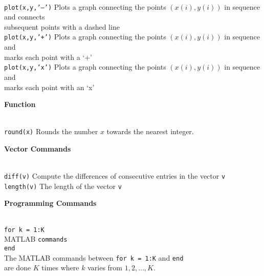 \documentclass{ximera}
\begin{document}
\begin{tabbing}
 \hspace{1.2in} \= \\
 
     {\tt plot(x,y,'--')}   \>
 Plots a graph connecting the points $(x(i),y(i))$
        in sequence and connects \\ \> subsequent points with a dashed line\\

     {\tt plot(x,y,'+')}   \>
 Plots a graph connecting the points $(x(i),y(i))$
        in sequence and \\ \>  marks each point with a `+'\\

     {\tt plot(x,y,'x')}   \>
 Plots a graph connecting the points $(x(i),y(i))$
        in sequence and \\ \>  marks each point with an `x'  

 
\end{tabbing}


\centerline{
{\bf \Matlab Function}
} \vspace*{-0.1in}
\begin{tabbing}
 \hspace{1.1in} \= \\

     {\tt round(x)}   \>
Rounds the number $x$ towards the nearest integer.

\end{tabbing}

\centerline{
{\bf Vector Commands}
} \vspace*{-0.1in}
\begin{tabbing}
 \hspace{1.1in} \= \\
 
     {\tt diff(v)}   \>
Compute the differences of consecutive entries in the vector {\tt v}\\ 
     {\tt length(v)}   \>
The length of the vector {\tt v}
 
\end{tabbing}
 

\centerline{
{\bf Programming Commands}
} \vspace*{-0.1in}
\begin{tabbing}
 \hspace{1.1in} \= \\

     {\tt for k = 1:K}   \>\\
	\hspace{0.1in} MATLAB {\tt commands} \> \\
     {\tt end} \> \\
\> The MATLAB commands between {\tt for k = 1:K} and {\tt end}\\ \>
are done $K$ times where $k$ varies from $1,2,\ldots,K$.

\end{tabbing}
\end{document}
